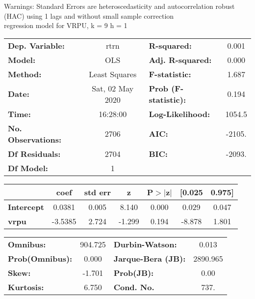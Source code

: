 Warnings: \newline
 [1] Standard Errors are heteroscedasticity and autocorrelation robust (HAC) using 1 lags and without small sample correction\\ 

regression model for VRPU, k = 9 h = 1\begin{center}
\begin{tabular}{lclc}
\toprule
\textbf{Dep. Variable:}    &       rtrn       & \textbf{  R-squared:         } &     0.001   \\
\textbf{Model:}            &       OLS        & \textbf{  Adj. R-squared:    } &     0.000   \\
\textbf{Method:}           &  Least Squares   & \textbf{  F-statistic:       } &     1.687   \\
\textbf{Date:}             & Sat, 02 May 2020 & \textbf{  Prob (F-statistic):} &    0.194    \\
\textbf{Time:}             &     16:28:00     & \textbf{  Log-Likelihood:    } &    1054.5   \\
\textbf{No. Observations:} &        2706      & \textbf{  AIC:               } &    -2105.   \\
\textbf{Df Residuals:}     &        2704      & \textbf{  BIC:               } &    -2093.   \\
\textbf{Df Model:}         &           1      & \textbf{                     } &             \\
\bottomrule
\end{tabular}
\begin{tabular}{lcccccc}
                   & \textbf{coef} & \textbf{std err} & \textbf{z} & \textbf{P$> |$z$|$} & \textbf{[0.025} & \textbf{0.975]}  \\
\midrule
\textbf{Intercept} &       0.0381  &        0.005     &     8.140  &         0.000        &        0.029    &        0.047     \\
\textbf{vrpu}      &      -3.5385  &        2.724     &    -1.299  &         0.194        &       -8.878    &        1.801     \\
\bottomrule
\end{tabular}
\begin{tabular}{lclc}
\textbf{Omnibus:}       & 904.725 & \textbf{  Durbin-Watson:     } &    0.013  \\
\textbf{Prob(Omnibus):} &   0.000 & \textbf{  Jarque-Bera (JB):  } & 2890.965  \\
\textbf{Skew:}          &  -1.701 & \textbf{  Prob(JB):          } &     0.00  \\
\textbf{Kurtosis:}      &   6.750 & \textbf{  Cond. No.          } &     737.  \\
\bottomrule
\end{tabular}
\end{center}

